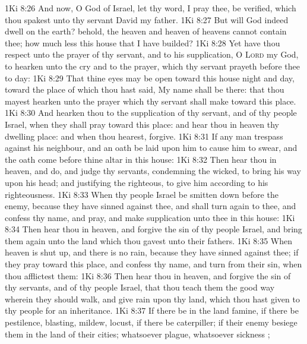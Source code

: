 \vs 1Ki 8:26 And now, O God of Israel, let thy word, I pray thee, be verified, which thou spakest unto thy servant David my father.
\vs 1Ki 8:27 But will God indeed dwell on the earth? behold, the heaven and heaven of heavens cannot contain thee; how much less this house that I have builded?
\vs 1Ki 8:28 Yet have thou respect unto the prayer of thy servant, and to his supplication, O \textsc{Lord} my God, to hearken unto the cry and to the prayer, which thy servant prayeth before thee to day:
\vs 1Ki 8:29 That thine eyes may be open toward this house night and day,  toward the place of which thou hast said, My name shall be there: that thou mayest hearken unto the prayer which thy servant shall make toward this place.
\vs 1Ki 8:30 And hearken thou to the supplication of thy servant, and of thy people Israel, when they shall pray toward this place: and hear thou in heaven thy dwelling place: and when thou hearest, forgive.
\vs 1Ki 8:31 If any man trespass against his neighbour, and an oath be laid upon him to cause him to swear, and the oath come before thine altar in this house:
\vs 1Ki 8:32 Then hear thou in heaven, and do, and judge thy servants, condemning the wicked, to bring his way upon his head; and justifying the righteous, to give him according to his righteousness.
\vs 1Ki 8:33 When thy people Israel be smitten down before the enemy, because they have sinned against thee, and shall turn again to thee, and confess thy name, and pray, and make supplication unto thee in this house:
\vs 1Ki 8:34 Then hear thou in heaven, and forgive the sin of thy people Israel, and bring them again unto the land which thou gavest unto their fathers.
\vs 1Ki 8:35 When heaven is shut up, and there is no rain, because they have sinned against thee; if they pray toward this place, and confess thy name, and turn from their sin, when thou afflictest them:
\vs 1Ki 8:36 Then hear thou in heaven, and forgive the sin of thy servants, and of thy people Israel, that thou teach them the good way wherein they should walk, and give rain upon thy land, which thou hast given to thy people for an inheritance.
\vs 1Ki 8:37 If there be in the land famine, if there be pestilence, blasting, mildew, locust,  if there be caterpiller; if their enemy besiege them in the land of their cities; whatsoever plague, whatsoever sickness ;

